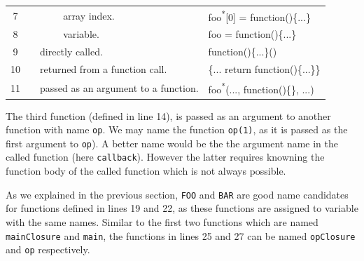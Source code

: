 \documentclass{acm_proc_article-sp}
\begin{document}
\begin{table}
{\begin{tabular}{ | c | l | l | l | m{2.5cm} | l|}
   7 &
   &
   & \multicolumn{2}{|l|}{
      array index.}
   & foo\textsuperscript{*}[0] = function()\{...\} \\
   \cline{0-0}\cline{4-6} 

   8 &
   & 
   & \multicolumn{2}{|l|}{
      variable.}
   & foo = function()\{...\} \\
   \cline{0-0}\cline{3-6} 
   
   9 &
   & \multicolumn{3}{|m{3.8cm}|}{
     \raggedright directly called.}
   & function()\{...\}() \\
   \cline{0-0}\cline{3-6} 

   10 &
   & \multicolumn{3}{|m{3.5cm}|}{
     \raggedright returned from a function call.}
   & \{... return function()\{...\}\} \\
   \cline{0-0}\cline{3-6} 

   11 &
   & \multicolumn{3}{|m{3.5cm}|}{
     \raggedright passed as an argument to a function.}
   & foo\textsuperscript{*}(..., function()\{\}, ...) \\
   \hline 

  \end{tabular}
  }
 \label{function-types} 
\end{table}

 The third function (defined in line 14), is passed as an argument to another function with name {\small\texttt{op}}. We may name the function {\small\texttt{op(1)}}, as it is passed as the first argument to {\small\texttt{op}}). A better name would be the the argument name in the called function (here {\small\texttt{callback}}). However the latter requires knowning the function body of the called function which is not always possible.
    
    As we explained in the previous section, {\small\texttt{FOO}} and {\small\texttt{BAR}} are good name candidates for functions defined in lines 19 and 22, as these functions are assigned to variable with the same names. Similar to the first two functions which are named {\small\texttt{mainClosure}} and {\small\texttt{main}}, the functions in lines 25 and 27 can be named {\small\texttt{opClosure}} and {\small\texttt{op}} respectively.
 
\end{document}
